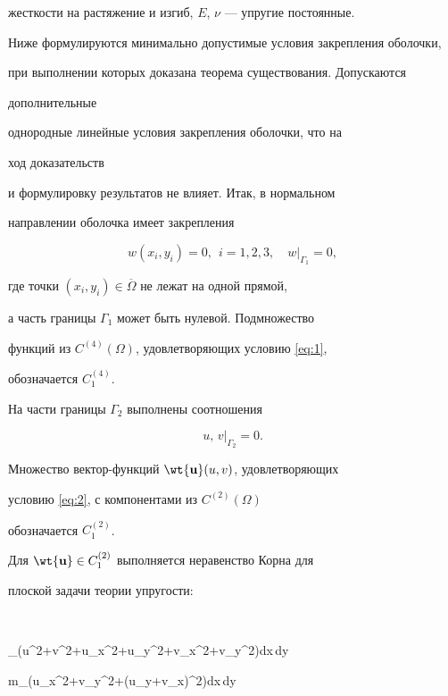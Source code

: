 жесткости на растяжение и изгиб, $E$, $\nu$ --- упругие постоянные.





Ниже формулируются минимально допустимые условия закрепления оболочки,


при выполнении которых доказана теорема существования. Допускаются


дополнительные


однородные линейные условия закрепления оболочки, что на


ход доказательств


и формулировку результатов не влияет. Итак, в нормальном


направлении оболочка имеет закрепления


\begin{equation} \label{eq:1}


w(x_i, y_i)=0,\ \ i=1,2,3, \quad w|_{\Gamma_1}=0,


\end{equation}


где точки $(x_i,y_i)\in \overline{\Omega}$ не лежат на одной прямой, 


а часть границы $\Gamma_1$ может быть нулевой. Подмножество


функций из $C^{(4)}(\Omega)$, удовлетворяющих условию \eqref{eq:1},


обозначается $C_1^{(4)}$.





На части границы $\Gamma_2$ выполнены соотношения


\begin{equation} \label{eq:2}


u,\,v|_{\Gamma_2}=0.


\end{equation}


Множество вектор-функций $\wt {\bold u}(u,v)$, удовлетворяющих


условию \eqref{eq:2}, с компонентами из $C^{(2)}(\Omega)$


обозначается $C_1^{(2)}$.


Для $\wt {\bold u}\in C_1^{(2)}$ выполняется неравенство Корна для


плоской задачи теории упругости:


$$


\iint\limits_\Omega (u^2+v^2+u_x^2+u_y^2+v_x^2+v_y^2)dx\,dy\leqslant


m\iint\limits_\Omega \limits \big(u_x^2+v_y^2+(u_y+v_x)^2\big)dx\,dy


